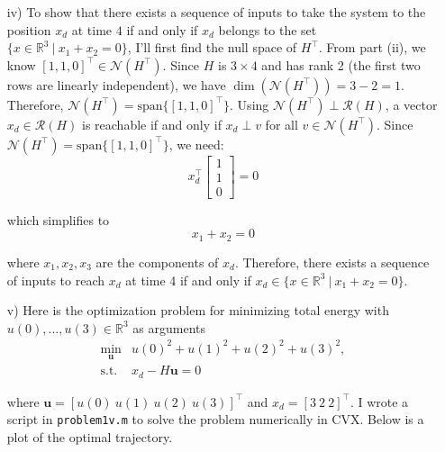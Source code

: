 \begin{homeworkProblem}
\begin{solution}
\begin{itemize}
            \item[iv)] To show that there exists a sequence of inputs to take 
                the system to the position $x_d$ at time $4$ if and only if 
                $x_d$ belongs to the set $\{x\in\mathbb R^3\ | \ x_1+x_2=0\}$, 
                I'll first find the null space of $H^\top$. From part (ii), 
                we know $[1, 1, 0]^\top \in \mathcal{N}(H^\top)$. Since $H$ is 
                $3 \times 4$ and has rank 2 (the first two rows are linearly 
                independent), we have $\dim(\mathcal{N}(H^\top)) = 3 - 2 = 1$. 
                Therefore, $\mathcal{N}(H^\top) = \text{span}\{[1, 1, 0]^\top\}$.
                Using $\mathcal{N}(H^\top) \perp \mathcal{R}(H)$, a vector $x_d
                \in \mathcal{R}(H)$ is reachable if and only if $x_d \perp v$ 
                for all $v \in \mathcal{N}(H^\top)$. Since $\mathcal{N}(H^\top) 
                = \text{span}\{[1, 1, 0]^\top\}$, we need:
                \[
                    x_d^\top \left[\begin{array}{c} 1 \\ 1 \\ 0 \end{array} \right] = 0
                \]

                which simplifies to
                \[
                    x_1 + x_2 = 0
                \]

                where $x_1, x_2, x_3$ are the components of $x_d$. Therefore, 
                there exists a sequence of inputs to reach $x_d$ at time 4 if 
                and only if $x_d \in \{x \in \mathbb{R}^3\ | \ x_1 + x_2 = 0\}$.

            
            \item[v)] Here is the optimization problem for minimizing total 
                energy with $u(0),..., u(3) \in \mathbb{R}^3$ as arguments
                \[
                    \begin{array}{rl}
                        \min\limits_{\boldsymbol{u}} & u(0)^2 + u(1)^2 + u(2)^2 + u(3)^2, \\ [2ex]
                        \text{s.t.} & x_d - H \boldsymbol{u} = 0
                    \end{array}
                \]

                where $\boldsymbol{u} = [u(0) \ u(1) \ u(2) \ u(3)]^\top$ and
                $x_d = [3 \ 2 \ 2]^\top$. I wrote a script in \texttt{problem1v.m}
                to solve the problem numerically in CVX. Below is a plot of the
                optimal trajectory.
                

\end{itemize}
\end{solution}
\end{homeworkProblem}
